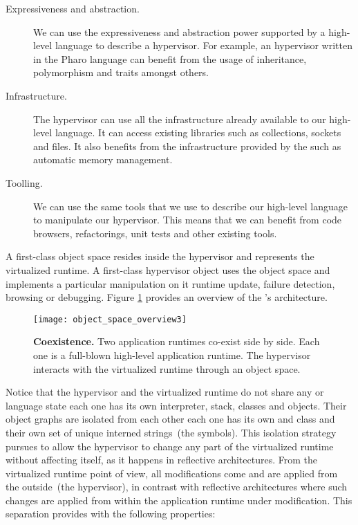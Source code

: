 \begin{description}
\item[Expressiveness and abstraction.] We can use the expressiveness and abstraction power supported by a high-level language to describe a hypervisor. For example, an hypervisor written in the Pharo language can benefit from the usage of inheritance, polymorphism and traits amongst others.
\item[Infrastructure.] The hypervisor can use all the infrastructure already available to our high-level language. It can access existing libraries such as collections, sockets and files. It also benefits from the infrastructure provided by the \VM such as automatic memory management.
\item[Toolling.] We can use the same tools that we use to describe our high-level language to manipulate our hypervisor. This means that we can benefit from code browsers, refactorings, unit tests and other existing tools.
\end{description}


A first-class object space resides inside the hypervisor and represents the virtualized runtime. A first-class hypervisor object uses the object space and implements a particular manipulation on it \eg runtime update, failure detection, browsing or debugging. Figure \ref{fig:objectSpaceOverview_architecture} provides an overview of the \Vtt's architecture.

\begin{figure}[ht]
\begin{center}
\texttt{[image: object\_space\_overview3]}
\caption{\textbf{\VTT Coexistence.} Two application runtimes co-exist side by side. Each one is a full-blown high-level application runtime. The hypervisor interacts with the virtualized runtime through an object space.\label{fig:objectSpaceOverview_architecture}}
\end{center}
\end{figure}


Notice that the hypervisor and the virtualized runtime do not share any \VM or language state \ie each one has its own interpreter, stack, classes and objects. Their object graphs are isolated from each other \eg each one has its own  and  class and their own set of unique interned strings~(the symbols). This isolation strategy pursues to allow the hypervisor to change any part of the virtualized runtime without affecting itself, as it happens in reflective architectures. From the virtualized runtime point of view, all modifications come and are applied from the outside~(the hypervisor), in contrast with reflective architectures where such changes are applied from within the application runtime under modification. This separation provides \Vtt with the following properties:

